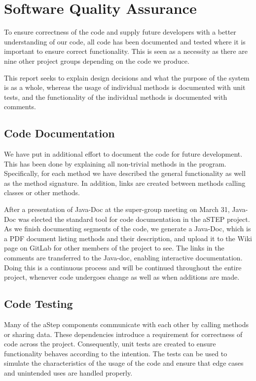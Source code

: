 \section{Software Quality Assurance}\label{sec:unit_test}
To ensure correctness of the code and supply future developers with a better understanding of our code, all code has been documented and tested where it is important to ensure correct functionality. This is seen as a necessity as there are nine other project groups depending on the code we produce.

This report seeks to explain design decisions and what the purpose of the system is as a whole, whereas the usage of individual methods is documented with unit tests, and the functionality of the individual methods is documented with comments.

\subsection{Code Documentation} \label{sec:code_documentation}
We have put in additional effort to document the code for future development. This has been done by explaining all non-trivial methods in the program. Specifically, for each method we have described the general functionality as well as the method signature. In addition, links are created between methods calling classes or other methods. 

After a presentation of Java-Doc at the super-group meeting on March 31, Java-Doc was elected the standard tool for code documentation in the aSTEP project.
As we finish documenting segments of the code, we generate a Java-Doc, which is a PDF document listing methods and their description, and upload it to the Wiki page \cite{dokumentation_astep} on GitLab for other members of the project to see. The links in the comments are transferred to the Java-doc, enabling interactive documentation. 
Doing this is a continuous process and will be continued throughout the entire project, whenever code undergoes change as well as when additions are made.

\subsection{Code Testing}
Many of the aStep components communicate with each other by calling methods or sharing data. These dependencies introduce a requirement for correctness of code across the project. Consequently, unit tests are created to ensure functionality behaves according to the intention. The tests can be used to simulate the characteristics of the usage of the code and ensure that edge cases and unintended uses are handled properly. 

